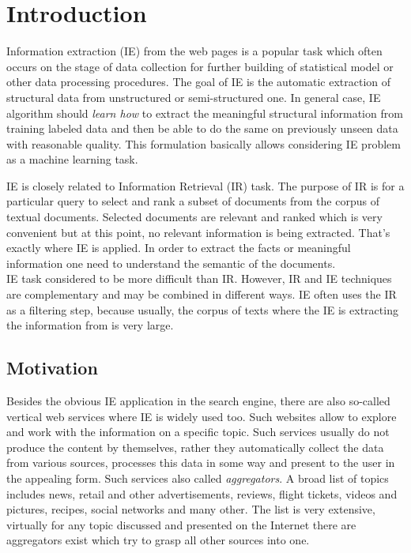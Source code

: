 \chapter{Introduction}
\label{chap:intro}
Information extraction (IE) from the web pages is a popular task which often occurs on the stage of data collection for further building of statistical model or other data processing procedures. The goal of IE is the automatic extraction of structural data from unstructured or semi-structured one. In general case, IE algorithm should \textit{learn how} to extract the meaningful structural information from training labeled data and then be able to do the same on previously unseen data with reasonable quality. This formulation basically allows considering IE problem as a machine learning task.

IE is closely related to Information Retrieval (IR) task. The purpose of IR is for a particular query to select and rank a subset of documents from the corpus of textual documents. Selected documents are relevant and ranked which is very convenient but at this point, no relevant information is being extracted. That's exactly where IE is applied. In order to extract the facts or meaningful information one need to understand the semantic of the documents.\\

IE task considered to be more difficult than IR. However, IR and IE techniques are complementary and may be combined in different ways. IE often uses the IR as a filtering step, because usually, the corpus of texts where the IE is extracting the information from is very large.\\

\cite{IEstate}




\section{Motivation}
Besides the obvious IE application in the search engine, there are also so-called vertical web services where IE is widely used too. Such websites allow to explore and work with the information on a specific topic. Such services usually do not produce the content by themselves, rather they automatically collect the data from various sources, processes this data in some way and present to the user in the appealing form. Such services also called \textit{aggregators}. A broad list of topics includes news, retail and other advertisements, reviews, flight tickets, videos and pictures, recipes, social networks and many other. The list is very extensive, virtually for any topic discussed and presented on the Internet there are aggregators exist which try to grasp all other sources into one. \\

